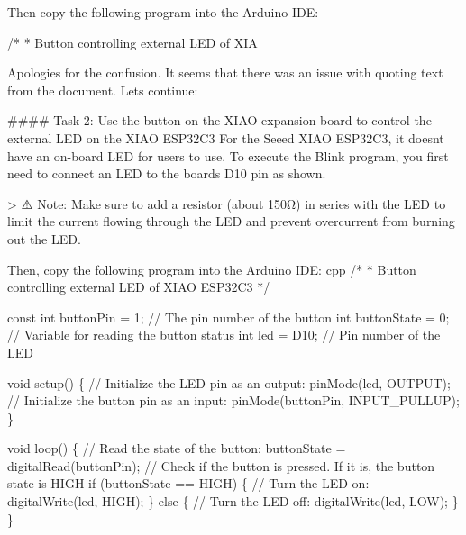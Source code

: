 \documentclass[
  letterpaper,
  DIV=11,
  numbers=noendperiod]{scrreprt}
\newenvironment{Shaded}{\begin{snugshade}}{\end{snugshade}}
\newcommand{\AttributeTok}[1]{\textcolor[rgb]{0.40,0.45,0.13}{#1}}
\newcommand{\CommentTok}[1]{\textcolor[rgb]{0.37,0.37,0.37}{#1}}
\newcommand{\ControlFlowTok}[1]{\textcolor[rgb]{0.00,0.23,0.31}{#1}}
\newcommand{\DataTypeTok}[1]{\textcolor[rgb]{0.68,0.00,0.00}{#1}}
\newcommand{\DecValTok}[1]{\textcolor[rgb]{0.68,0.00,0.00}{#1}}
\newcommand{\NormalTok}[1]{\textcolor[rgb]{0.00,0.23,0.31}{#1}}
\newcommand{\OperatorTok}[1]{\textcolor[rgb]{0.37,0.37,0.37}{#1}}
\begin{document}
Then copy the following program into the Arduino IDE:

\begin{Shaded}
\begin{Highlighting}[]
\CommentTok{/*}
\CommentTok{ * Button controlling external LED of XIA}

\CommentTok{Apologies for the confusion. It seems that there was an issue with quoting text from the document. Let\textquotesingle{}s continue:}

\CommentTok{\#\#\#\# Task 2: Use the button on the XIAO expansion board to control the external LED on the XIAO ESP32C3}
\CommentTok{For the Seeed XIAO ESP32C3, it doesn\textquotesingle{}t have an on{-}board LED for users to use. To execute the Blink program, you first need to connect an LED to the board\textquotesingle{}s \textasciigrave{}D10\textasciigrave{} pin as shown. }

\CommentTok{\textgreater{} ⚠️ Note: Make sure to add a resistor (about 150Ω) in series with the LED to limit the current flowing through the LED and prevent overcurrent from burning out the LED.}

\CommentTok{Then, copy the following program into the Arduino IDE:}
\CommentTok{\textasciigrave{}\textasciigrave{}\textasciigrave{}cpp}
\CommentTok{/*}
\CommentTok{ * Button controlling external LED of XIAO ESP32C3}
\CommentTok{ */}

\AttributeTok{const} \DataTypeTok{int}\NormalTok{ buttonPin }\OperatorTok{=} \DecValTok{1}\OperatorTok{;}     \CommentTok{// The pin number of the button}
\DataTypeTok{int}\NormalTok{ buttonState }\OperatorTok{=} \DecValTok{0}\OperatorTok{;}    \CommentTok{// Variable for reading the button status}
\DataTypeTok{int}\NormalTok{ led }\OperatorTok{=}\NormalTok{ D10}\OperatorTok{;}  \CommentTok{// Pin number of the LED}

\DataTypeTok{void}\NormalTok{ setup}\OperatorTok{()} \OperatorTok{\{}
  \CommentTok{// Initialize the LED pin as an output:}
\NormalTok{  pinMode}\OperatorTok{(}\NormalTok{led}\OperatorTok{,}\NormalTok{ OUTPUT}\OperatorTok{);}
  \CommentTok{// Initialize the button pin as an input:}
\NormalTok{  pinMode}\OperatorTok{(}\NormalTok{buttonPin}\OperatorTok{,}\NormalTok{ INPUT\_PULLUP}\OperatorTok{);}
\OperatorTok{\}}

\DataTypeTok{void}\NormalTok{ loop}\OperatorTok{()} \OperatorTok{\{}
  \CommentTok{// Read the state of the button:}
\NormalTok{  buttonState }\OperatorTok{=}\NormalTok{ digitalRead}\OperatorTok{(}\NormalTok{buttonPin}\OperatorTok{);}
  \CommentTok{// Check if the button is pressed. If it is, the button state is HIGH}
  \ControlFlowTok{if} \OperatorTok{(}\NormalTok{buttonState }\OperatorTok{==}\NormalTok{ HIGH}\OperatorTok{)} \OperatorTok{\{}
    \CommentTok{// Turn the LED on:}
\NormalTok{    digitalWrite}\OperatorTok{(}\NormalTok{led}\OperatorTok{,}\NormalTok{ HIGH}\OperatorTok{);}
  \OperatorTok{\}}
  \ControlFlowTok{else} \OperatorTok{\{}
    \CommentTok{// Turn the LED off:}
\NormalTok{    digitalWrite}\OperatorTok{(}\NormalTok{led}\OperatorTok{,}\NormalTok{ LOW}\OperatorTok{);}
  \OperatorTok{\}}
\OperatorTok{\}}
\end{Highlighting}
\end{Shaded}
\end{document}
